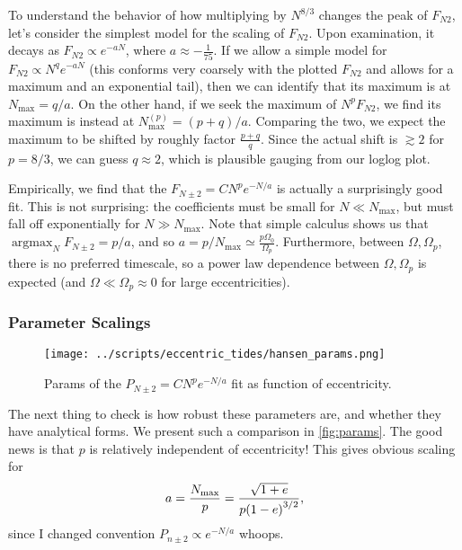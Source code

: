 \documentclass[11pt,
        usenames, %
        dvipsnames %
    ]{article}
\DeclareMathOperator*{\argmax}{argmax}
\DeclarePairedDelimiter\p{\lparen}{\rparen}
\begin{document}
To understand the behavior of how multiplying by $N^{8/3}$ changes the peak of
$F_{N2}$, let's consider the simplest model for the scaling of $F_{N2}$. Upon
examination, it decays as $F_{N2} \propto e^{-aN}$, where $a \approx
-\frac{1}{75}$. If we allow a simple model for $F_{N2} \propto N^q e^{-aN}$
(this conforms very coarsely with the plotted $F_{N2}$ and allows for a maximum
and an exponential tail), then we can identify that its maximum is at $N_{\max}
= q/a$. On the other hand, if we seek the maximum of $N^{p}F_{N2}$, we find its
maximum is instead at $N_{\max}^{(p)} = (p + q) / a$. Comparing the two, we
expect the maximum to be shifted by roughly factor $\frac{p + q}{q}$. Since the
actual shift is $\gtrsim 2$ for $p = 8/3$, we can guess $q \approx 2$, which is
plausible gauging from our loglog plot.

Empirically, we find that the $F_{N\pm 2} = CN^pe^{-N/a}$ is actually a
surprisingly good fit. This is not surprising: the coefficients must be small
for $N \ll N_{\max}$, but must fall off exponentially for $N \gg N_{\max}$. Note
that simple calculus shows us that $\argmax_N F_{N \pm 2} = p/a$, and so $a =
p / N_{\max} \simeq \frac{p\Omega_0}{\Omega_p}$. Furthermore, between $\Omega,
\Omega_p$, there is no preferred timescale, so a power law dependence between
$\Omega, \Omega_p$ is expected (and $\Omega \ll \Omega_p \approx 0$ for large
eccentricities).

\subsubsection{Parameter Scalings}

\begin{figure}[t]
    \centering
    \texttt{[image: ../scripts/eccentric\_tides/hansen\_params.png]}
    \caption{Params of the $P_{N \pm 2} = CN^pe^{-N/a}$ fit as function of
    eccentricity.}\label{fig:params}
\end{figure}
The next thing to check is how robust these parameters are, and whether they
have analytical forms. We present such a comparison in \autoref{fig:params}.
The good news is that $p$ is relatively independent of eccentricity! This gives
obvious scaling for
\begin{equation}
    a = \frac{N_{\max}}{p} = \frac{\sqrt{1 + e}}{p\p*{1 - e}^{3/2}},
\end{equation}
since I changed convention $P_{n \pm 2} \propto e^{-N/a}$ whoops.
\end{document}

